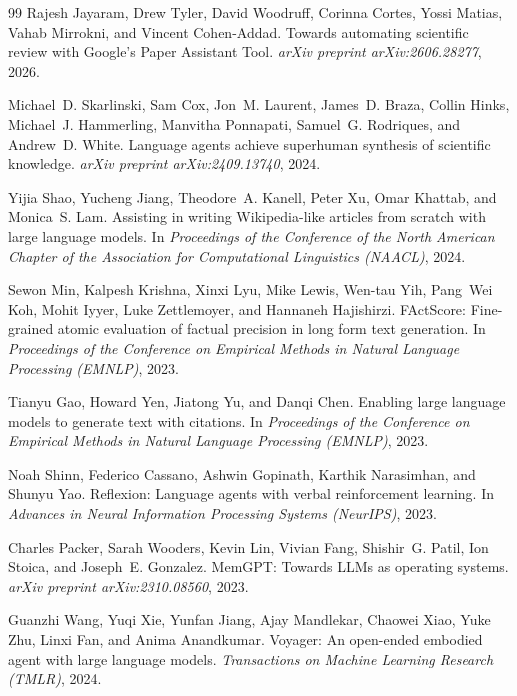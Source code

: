 \documentclass[11pt,a4paper]{article}
\begin{document}
\begin{thebibliography}{99}
Rajesh Jayaram, Drew Tyler, David Woodruff, Corinna Cortes, Yossi Matias, Vahab Mirrokni, and Vincent Cohen-Addad.
\newblock Towards automating scientific review with Google's Paper Assistant Tool.
\newblock \emph{arXiv preprint arXiv:2606.28277}, 2026.

Michael~D. Skarlinski, Sam Cox, Jon~M. Laurent, James~D. Braza, Collin Hinks, Michael~J. Hammerling, Manvitha Ponnapati, Samuel~G. Rodriques, and Andrew~D. White.
\newblock Language agents achieve superhuman synthesis of scientific knowledge.
\newblock \emph{arXiv preprint arXiv:2409.13740}, 2024.

Yijia Shao, Yucheng Jiang, Theodore~A. Kanell, Peter Xu, Omar Khattab, and Monica~S. Lam.
\newblock Assisting in writing Wikipedia-like articles from scratch with large language models.
\newblock In \emph{Proceedings of the Conference of the North American Chapter of the Association for Computational Linguistics (NAACL)}, 2024.

Sewon Min, Kalpesh Krishna, Xinxi Lyu, Mike Lewis, Wen-tau Yih, Pang~Wei Koh, Mohit Iyyer, Luke Zettlemoyer, and Hannaneh Hajishirzi.
\newblock FActScore: Fine-grained atomic evaluation of factual precision in long form text generation.
\newblock In \emph{Proceedings of the Conference on Empirical Methods in Natural Language Processing (EMNLP)}, 2023.

Tianyu Gao, Howard Yen, Jiatong Yu, and Danqi Chen.
\newblock Enabling large language models to generate text with citations.
\newblock In \emph{Proceedings of the Conference on Empirical Methods in Natural Language Processing (EMNLP)}, 2023.

Noah Shinn, Federico Cassano, Ashwin Gopinath, Karthik Narasimhan, and Shunyu Yao.
\newblock Reflexion: Language agents with verbal reinforcement learning.
\newblock In \emph{Advances in Neural Information Processing Systems (NeurIPS)}, 2023.

Charles Packer, Sarah Wooders, Kevin Lin, Vivian Fang, Shishir~G. Patil, Ion Stoica, and Joseph~E. Gonzalez.
\newblock MemGPT: Towards LLMs as operating systems.
\newblock \emph{arXiv preprint arXiv:2310.08560}, 2023.

Guanzhi Wang, Yuqi Xie, Yunfan Jiang, Ajay Mandlekar, Chaowei Xiao, Yuke Zhu, Linxi Fan, and Anima Anandkumar.
\newblock Voyager: An open-ended embodied agent with large language models.
\newblock \emph{Transactions on Machine Learning Research (TMLR)}, 2024.


\end{thebibliography}
\end{document}
